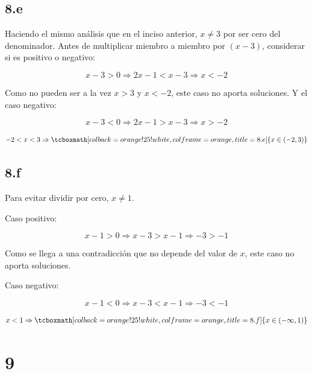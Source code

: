 \documentclass{article}
\newcommand{\hresult}[2]{\tcboxmath[colback=orange!25!white,colframe=orange, title=#1] {#2} }
\begin{document}
\subsection*{8.e}
\label{subsec:8.e}

Haciendo el mismo análisis que en el inciso anterior, $x \neq 3$ por ser cero del denominador. Antes de multiplicar miembro a miembro por $(x-3)$, considerar si es positivo o negativo:

\begin{equation}
x - 3 > 0 \Rightarrow 2x - 1 < x - 3 \Rightarrow x < -2
\end{equation}

Como no pueden ser a la vez $x > 3$ y $x < -2$, este caso no aporta soluciones. Y el caso negativo:

\begin{equation}
x - 3 < 0 \Rightarrow 2x - 1 > x - 3 \Rightarrow x > -2
\end{equation}

\begin{equation}
-2 < x < 3 \Rightarrow \hresult{8.e} { x \in (-2, 3) }
\end{equation}

\subsection*{8.f}
\label{subsec:8.f}

Para evitar dividir por cero, $x \neq 1$.

Caso positivo:

\begin{equation}
x - 1 > 0 \Rightarrow x - 3 > x - 1 \Rightarrow -3 > -1
\end{equation}

Como se llega a una contradicción que no depende del valor de $x$, este caso no aporta soluciones.

Caso negativo:

\begin{equation}
x - 1 < 0 \Rightarrow x - 3 < x - 1 \Rightarrow -3 < -1
\end{equation}

\begin{equation}
x < 1 \Rightarrow \hresult{8.f} { x \in (-\infty, 1) }
\end{equation}

\section*{9}
\label{sec:9}
\end{document}
